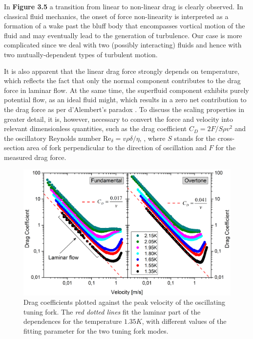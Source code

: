 In {\sffamily\textbf{Figure 3.5}} a transition from linear to non-linear drag is clearly observed. In classical fluid mechanics, the onset of force non-linearity is interpreted as a formation of a wake past the bluff body that encompasses vortical motion of the fluid and may eventually lead to the generation of turbulence. Our case is more complicated since we deal with two (possibly interacting) fluids and hence with two mutually-dependent types of turbulent motion.

It is also apparent that the linear drag force strongly depends on temperature, which reflects the fact that only the normal component contributes to the drag force in laminar flow. At the same time, the superfluid component exhibits purely potential flow, as an ideal fluid might, which results in a zero net contribution to the drag force as per d'Alembert's paradox \cite{landau}. To discuss the scaling properties in greater detail, it is, however, necessary to convert the force and velocity into relevant dimensionless quantities, such as the drag coefficient $ C_{D} = 2F/S\rho v^2 $ and the oscillatory Reynolds number $ \text{Re}_{\delta} = v\rho\delta/\eta $, , where $ S $ stands for the cross-section area of fork perpendicular to the direction of oscillation and $ F $ for the measured drag force.


\begin{figure}[h!]
	\centering
	\vspace{-0.3cm}
	\includegraphics[width=1\textwidth]{graphs/Merged_C_v}
	\caption{Drag coefficients plotted against the peak velocity of the oscillating tuning fork. The \textit{red dotted lines} fit the laminar part of the dependences for the temperature $ 1.35\unit{K} $, with different values of the fitting parameter for the two tuning fork modes. }
\end{figure}

